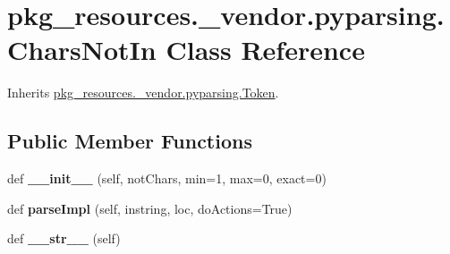 \hypertarget{classpkg__resources_1_1__vendor_1_1pyparsing_1_1_chars_not_in}{}\section{pkg\+\_\+resources.\+\_\+vendor.\+pyparsing.\+Chars\+Not\+In Class Reference}
\label{classpkg__resources_1_1__vendor_1_1pyparsing_1_1_chars_not_in}


Inherits \hyperlink{classpkg__resources_1_1__vendor_1_1pyparsing_1_1_token}{pkg\+\_\+resources.\+\_\+vendor.\+pyparsing.\+Token}.

\subsection*{Public Member Functions}
\begin{DoxyCompactItemize}
\item 
\mbox{\label{classpkg__resources_1_1__vendor_1_1pyparsing_1_1_chars_not_in_a53d43d0d66a157f1d1429421384e148e}} 
def {\bfseries \+\_\+\+\_\+init\+\_\+\+\_\+} (self, not\+Chars, min=1, max=0, exact=0)
\item 
\mbox{\label{classpkg__resources_1_1__vendor_1_1pyparsing_1_1_chars_not_in_a6aac95868d806bed5aefddeec62c8f95}} 
def {\bfseries parse\+Impl} (self, instring, loc, do\+Actions=True)
\item 
\mbox{\label{classpkg__resources_1_1__vendor_1_1pyparsing_1_1_chars_not_in_a1d14d1f8326ba197eeaf6c27040c8ced}} 
def {\bfseries \+\_\+\+\_\+str\+\_\+\+\_\+} (self)
\end{DoxyCompactItemize}
